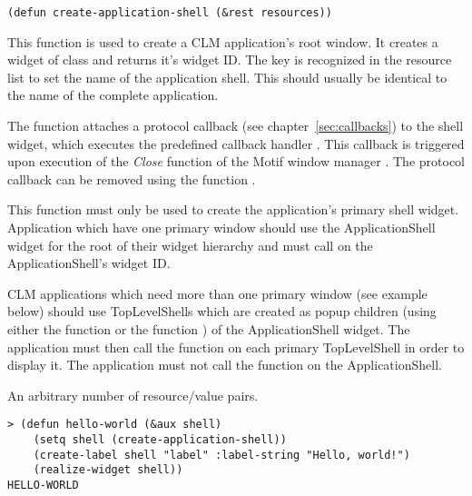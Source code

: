 \begin{lispd}
\syntax\begin{verbatim}
(defun create-application-shell (&rest resources))
\end{verbatim}
\beschr This function is used to create a CLM application's root window. It
creates a widget of class  and returns it's
widget ID. The key  is recognized in the resource list to set the
name of the application shell. This should usually be identical to the
name of the complete application.

The function attaches a protocol callback (see chapter~\ref{sec:callbacks}) to 
the shell widget, which executes the predefined callback handler
. This callback is triggered upon execution of the 
{\it Close} function of the Motif window manager . The protocol
callback can be removed using the function .

\hinweis This function must only be used to create the application's primary
shell widget.  Application which have one primary window should use the
ApplicationShell widget for the root of their widget hierarchy and must call
 on the ApplicationShell's widget ID. 

CLM applications which need more than one primary window (see example below)
should use TopLevelShells which are created as popup children (using either
the function  or the function
) of the ApplicationShell widget.  The application
must then call the function  on each primary TopLevelShell in order
to display it.  The application must not call the function 
on the ApplicationShell. 

\parameter
\begin{paramd}
 An arbitrary number of resource/value pairs.
\end{paramd}
\beispiel\begin{verbatim}
> (defun hello-world (&aux shell)
    (setq shell (create-application-shell))
    (create-label shell "label" :label-string "Hello, world!")
    (realize-widget shell))
HELLO-WORLD


\end{verbatim}
\end{lispd}
